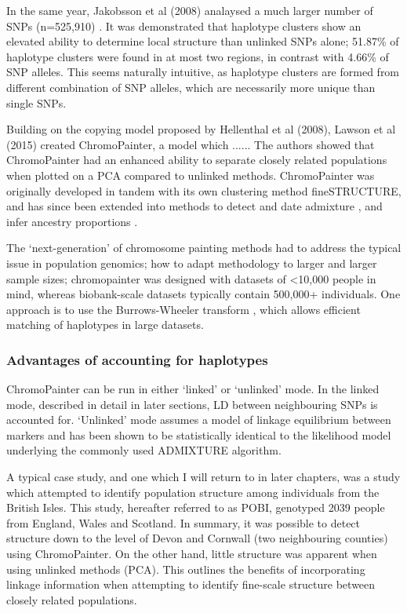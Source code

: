 In the same year, Jakobsson et al (2008) analaysed a much larger number of SNPs (n=525,910) \cite{jakobsson2008genotype}. It was demonstrated that haplotype clusters show an elevated ability to determine local structure than unlinked SNPs alone;  51.87\% of haplotype clusters were found in at most two regions, in contrast with 4.66\% of SNP alleles. This seems naturally intuitive, as haplotype clusters are formed from different combination of SNP alleles, which are necessarily more unique than single SNPs. 


Building on the copying model proposed by Hellenthal et al (2008), Lawson et al (2015) \cite{Lawson2012} created ChromoPainter, a model which ...... The authors showed that ChromoPainter had an enhanced ability to separate closely related populations when plotted on a PCA compared to unlinked methods. ChromoPainter was originally developed in tandem with its own clustering method fineSTRUCTURE, and has since been extended into methods to detect and date admixture \cite{Hellenthal2014}, and infer ancestry proportions \cite{Chacon-Duque2018}. 

The `next-generation' of chromosome painting methods had to address the typical issue in population genomics; how to adapt methodology to larger and larger sample sizes; chromopainter was designed with datasets of <10,000 people in mind, whereas biobank-scale datasets typically contain 500,000+ individuals. One approach is to use the Burrows-Wheeler transform \cite{burrows1994block, DurbinPBWT}, which allows efficient matching of haplotypes in large datasets.

\subsubsection{Advantages of accounting for haplotypes}

ChromoPainter can be run in either `linked' or `unlinked' mode. In the linked mode, described in detail in later sections, LD between neighbouring SNPs is accounted for. `Unlinked' mode assumes a model of linkage equilibrium between markers and has been shown to be statistically identical to the likelihood model underlying the commonly used ADMIXTURE algorithm. 

A typical case study, and one which I will return to in later chapters, was a study which attempted to identify population structure among individuals from the British Isles. This study, hereafter referred to as POBI, genotyped 2039 people from England, Wales and Scotland. In summary, it was possible to detect structure down to the level of Devon and Cornwall (two neighbouring counties) using ChromoPainter. On the other hand, little structure was apparent when using unlinked methods (PCA). This outlines the benefits of incorporating linkage information when attempting to identify fine-scale structure between closely related populations.

